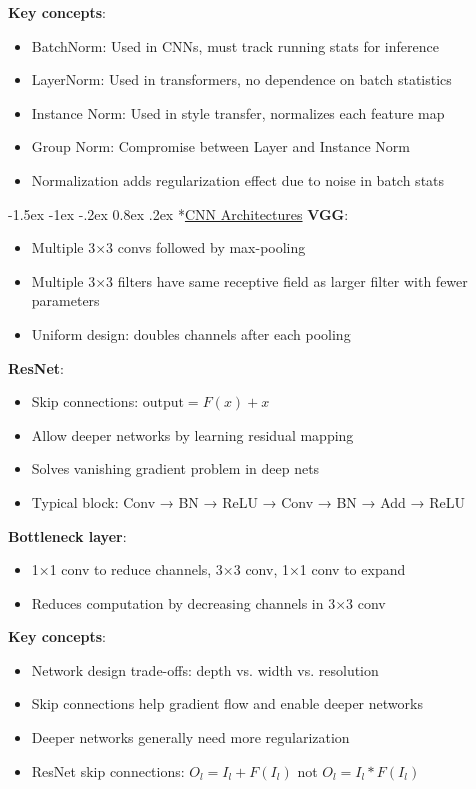 \documentclass{article}
\makeatletter
\renewcommand\section{\@startsection{section}{1}{\z@}%
                                  {-1.5ex \@plus -1ex \@minus -.2ex}%
                                  {0.8ex \@plus.2ex}%
                                  {\normalfont\small\bfseries}}
\makeatother
\begin{document}
\begin{multicols}{3}
\textbf{Key concepts}:
\begin{itemize}
\item BatchNorm: Used in CNNs, must track running stats for inference
\item LayerNorm: Used in transformers, no dependence on batch statistics
\item Instance Norm: Used in style transfer, normalizes each feature map
\item Group Norm: Compromise between Layer and Instance Norm
\item Normalization adds regularization effect due to noise in batch stats
\end{itemize}

\section*{\underline{CNN Architectures}}
\textbf{VGG}:
\begin{itemize}
\item Multiple 3×3 convs followed by max-pooling
\item Multiple 3×3 filters have same receptive field as larger filter with fewer parameters
\item Uniform design: doubles channels after each pooling
\end{itemize}

\textbf{ResNet}:
\begin{itemize}
\item Skip connections: $\text{output} = F(x) + x$
\item Allow deeper networks by learning residual mapping
\item Solves vanishing gradient problem in deep nets
\item Typical block: Conv → BN → ReLU → Conv → BN → Add → ReLU
\end{itemize}

\textbf{Bottleneck layer}:
\begin{itemize}
\item 1×1 conv to reduce channels, 3×3 conv, 1×1 conv to expand
\item Reduces computation by decreasing channels in 3×3 conv
\end{itemize}

\textbf{Key concepts}:
\begin{itemize}
\item Network design trade-offs: depth vs. width vs. resolution
\item Skip connections help gradient flow and enable deeper networks
\item Deeper networks generally need more regularization
\item ResNet skip connections: $O_l = I_l + F(I_l)$ not $O_l = I_l * F(I_l)$
\end{itemize}


\end{multicols}
\end{document}
